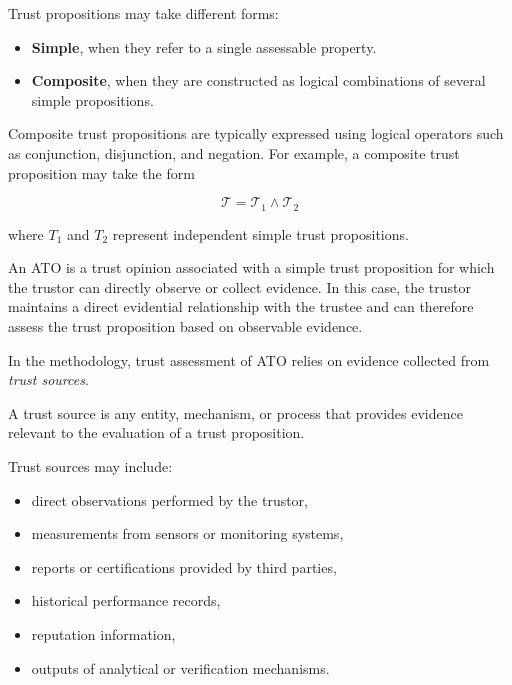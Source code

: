 Trust propositions may take different forms:
\begin{itemize}
    \item \textbf{Simple}, when they refer to a single assessable property.
    \item \textbf{Composite}, when they are constructed as logical combinations
    of several simple propositions.
\end{itemize}

Composite trust propositions are typically expressed using logical operators such as conjunction, disjunction, and negation. For example, a composite trust proposition may take the form

\[
\mathcal{T} = \mathcal{T}_1 \wedge \mathcal{T}_2
\]

where $T_1$ and $T_2$ represent independent simple trust propositions.








\begin{definition}
An \acf{ATO} is a trust opinion associated with a simple trust proposition for which the trustor can directly observe or collect evidence. In this case, the trustor maintains a direct evidential relationship with the trustee and can therefore assess the trust proposition based on observable evidence.
\end{definition}
In the methodology, trust assessment of \ac{ATO} relies on evidence collected from \emph{trust sources}.

\begin{definition}
\label{def:trust_source}
A trust source is any entity, mechanism, or process that provides evidence
relevant to the evaluation of a trust proposition.
\end{definition}
Trust sources may include:
\begin{itemize}
    \item direct observations performed by the trustor,
    \item measurements from sensors or monitoring systems,
    \item reports or certifications provided by third parties,
    \item historical performance records,
    \item reputation information,
    \item outputs of analytical or verification mechanisms.
\end{itemize}


